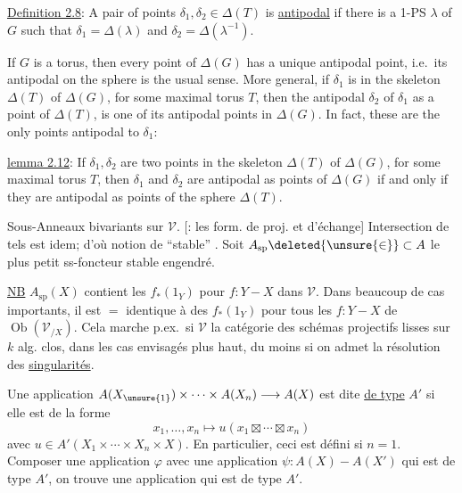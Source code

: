 \uline{Definition 2.8}: A pair of points $\delta_1,\delta_2\in\Delta(T)$ is \uline{antipodal} if there is a 1-PS $\lambda$ of $G$ such that $\delta_1=\Delta(\lambda)$ and $\delta_2=\Delta(\lambda^{-1})$.

If $G$ is a torus, then every point of $\Delta(G)$ has a unique antipodal point, i.e.\ its antipodal on the sphere is the usual sense. More general, if $\delta_1$ is in the skeleton $\Delta(T)$ of $\Delta(G)$, for some maximal torus $T$, then the antipodal $\delta_2$ of $\delta_1$ as a point of $\Delta(T)$, is one of its antipodal points in $\Delta(G)$. In fact, these are the only points antipodal to $\delta_1$:

\uline{lemma 2.12}: If $\delta_1,\delta_2$ are two points in the skeleton $\Delta(T)$ of $\Delta(G)$, for some maximal torus $T$, then $\delta_1$ and $\delta_2$ are antipodal as points of $\Delta(G)$ if and only if they are antipodal as points of the sphere $\Delta(T)$.

Sous-Anneaux bivariants sur $\mathcal V$. [:  les form. de proj. et d'échange]
Intersection de tels est idem; d'où notion de  ``stable'' . Soit $A_{\mathrm{sp}}\deleted{\unsure{\in}}\subset A$ le plus petit ss-foncteur stable engendré.

\uline{NB} $A_{\mathrm{sp}}(X)$ contient les $f_*(1_Y)$ pour $f:Y-X$ dans $\mathcal V$. Dans beaucoup de cas importants, il est $=$ identique à  des $f_*(1_Y)$ pour tous les $f:Y-X$ de $\operatorname{Ob}(\mathcal V_{/X})$. Cela marche p.ex.\ si $\mathcal V$ la catégorie des schémas projectifs lisses  sur $k$ alg. clos, dans les cas envisagés plus haut, du moins si on admet la résolution des \uline{singularités}.

Une application $A(X_{\unsure{1}})\times\cdots\times A(X_n)\longrightarrow A(X)$ est dite \uline{de type} $A'$ si elle est de la forme
\[
x_1,\ldots,x_n\longmapsto u(x_1\boxtimes\cdots\boxtimes x_n)
\]
avec $u\in A'(X_1\times\cdots\times X_n\times X)$. En  particulier, ceci est défini si $n=1$.
Composer une  application $\varphi$ avec une application $\psi:A(X)-A(X')$ qui est de type $A'$, on trouve une application qui est de type $A'$.

